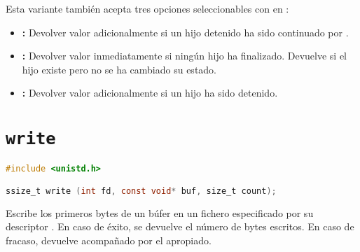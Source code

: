Esta variante también acepta tres opciones seleccionables con  en :

\begin{itemize}
	\item{}\textbf{:} Devolver valor adicionalmente si un hijo detenido ha sido continuado por .
	\item{}\textbf{:} Devolver valor inmediatamente si ningún hijo ha finalizado. Devuelve  si el hijo  existe pero no se ha cambiado su estado.
	\item{}\textbf{:} Devolver valor adicionalmente si un hijo ha sido detenido.
\end{itemize}

\section{\texttt{write}}\label{write}

\begin{lstlisting}[language=C]
#include <unistd.h>

ssize_t write (int fd, const void* buf, size_t count);
\end{lstlisting}

Escribe los  primeros bytes de un búfer  en un fichero especificado por su descriptor .
En caso de éxito, se devuelve el número de bytes escritos.
En caso de fracaso, devuelve  acompañado por el  apropiado.
